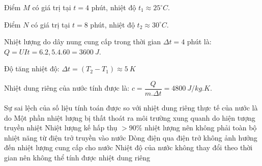 \begin{ex}
\begin{chc}
{	Điểm $M$ có giá trị tại $t=4$ phút, nhiệt độ $t_1 \approx 25^\circ C$.
	
	Điểm $N$ có giá trị tại $t=8$ phút, nhiệt độ $t_2 \approx 30^\circ C$.
	
	Nhiệt lượng do dây nung cung cấp trong thời gian $\Delta t=4$ phút là: $Q=UIt=6.2,5.4.60=3600\ J$. 
	
	Độ tăng nhiệt độ: $\Delta t=\left(T_2-T_1\right) \approx 5 \ K$
	
	Nhiệt dung riêng của nước tính được là: $c=\dfrac{Q}{m . \Delta t}=4800 \ J / kg . K$.
	}
\end{chc}
\begin{chc}
Sự sai lệch của số liệu tính toán được so với nhiệt dung riêng thực tế của nước là do
\choice
{\True Một phần nhiệt lượng bị thất thoát ra môi trường xung quanh do hiện tượng truyền nhiệt}
{Nhiệt lượng kế hấp thụ $>90\%$ nhiệt lượng nên không phải toàn bộ nhiệt năng từ điện trở truyền vào nước}
{Dòng điện qua điện trở không ảnh hưởng đến nhiệt lượng cung cấp cho nước}
{Nhiệt độ của nước không thay đổi theo thời gian nên không thể tính được nhiệt dung riêng}
\end{chc}
\end{ex}













